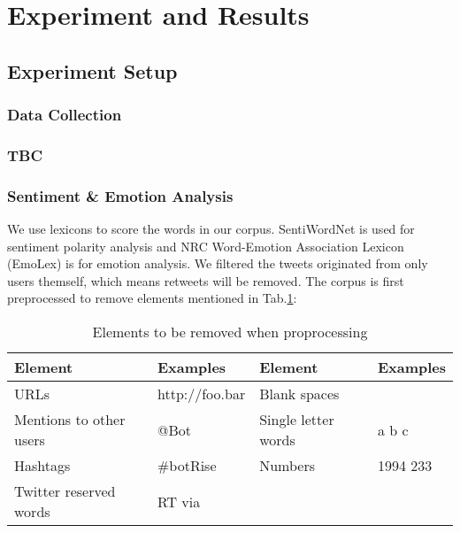 \section{Experiment and Results}

\subsection{Experiment Setup}

\subsubsection{Data Collection}

\subsubsection{TBC}

\subsubsection{Sentiment \& Emotion Analysis}

We use lexicons to score the words in our corpus.
SentiWordNet \citep{baccianella2010sentiwordnet} is used for sentiment polarity analysis and NRC Word-Emotion Association Lexicon (EmoLex) \citep{Mohammad13} is for emotion analysis.
We filtered the tweets originated from only users themself, which means retweets will be removed.
The corpus is first preprocessed to remove elements mentioned in Tab.\ref{table:elementsRemoved}:

\begin{table}[h]
  \caption{Elements to be removed when proprocessing}
  \label{table:elementsRemoved}
  \centering
  \renewcommand{\tabularxcolumn}{m} %
  \begin{tabularx}{\textwidth}{l  l || l  l}
    \toprule
    \textbf{Element} & \textbf{Examples} & \textbf{Element}    & \textbf{Examples}
    \tabularnewline \midrule
    URLs
                     &
    http://foo.bar   & Blank spaces      &
    \tabularnewline \hline
    Mentions to other users
                     & @Bot              & Single letter words & a b c
    \tabularnewline \hline
    Hashtags
                     & \#botRise         & Numbers             & 1994 233
    \tabularnewline \hline
    Twitter reserved words
                     & RT via            &
                     &
    \tabularnewline \bottomrule
  \end{tabularx}
\end{table}

